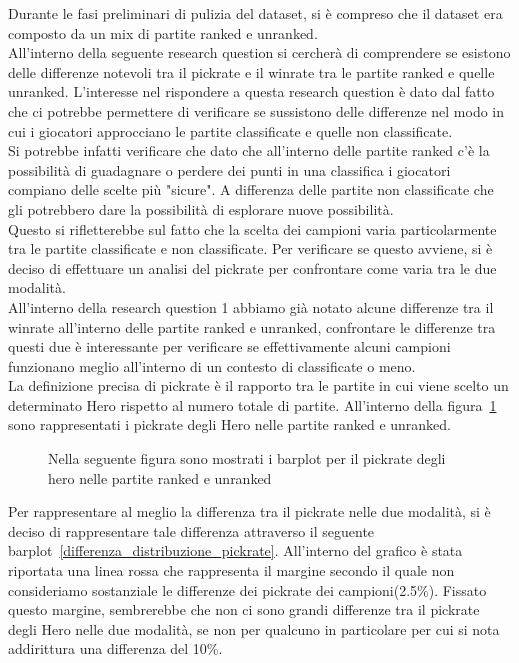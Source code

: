 Durante le fasi preliminari di pulizia del dataset, si è compreso che il dataset era composto da un mix di partite ranked e unranked. \\
All'interno della seguente research question si cercherà di comprendere se esistono delle differenze notevoli tra il pickrate e il winrate tra le partite ranked e quelle unranked. L'interesse nel rispondere a questa research question è dato dal fatto che ci potrebbe permettere di verificare se sussistono delle differenze nel modo in cui i giocatori approcciano le partite classificate e quelle non classificate. \\
Si potrebbe infatti verificare che dato che all'interno delle partite ranked c'è la possibilità di guadagnare o perdere dei punti in una classifica i giocatori compiano delle scelte più "sicure". A differenza delle partite non classificate che gli potrebbero dare la possibilità di esplorare nuove possibilità. \\
Questo si rifletterebbe sul fatto che la scelta dei campioni varia particolarmente tra le partite classificate e non classificate. Per verificare se questo avviene, si è deciso di effettuare un analisi del pickrate per confrontare come varia tra le due modalità. \\
All'interno della research question 1 abbiamo già notato alcune differenze tra il winrate all'interno delle partite ranked e unranked, confrontare le differenze tra questi due è interessante per verificare se effettivamente alcuni campioni funzionano meglio all'interno di un contesto di classificate o meno. \\
La definizione precisa di pickrate è il rapporto tra le partite in cui viene scelto un determinato Hero rispetto al numero totale di partite. All'interno della figura~\ref{distribuzione_pick_hero_ranked_unranked} sono rappresentati i pickrate degli Hero nelle partite ranked e unranked.
\begin{figure}[htbp]
\begin{center}
\hspace*{-0.15\linewidth}

\caption{Nella seguente figura sono mostrati i barplot per il pickrate degli hero nelle partite ranked e unranked}
\label{distribuzione_pick_hero_ranked_unranked}
\end{center}
\end{figure}
Per rappresentare al meglio la differenza tra il pickrate nelle due modalità, si è deciso di rappresentare tale differenza attraverso il seguente barplot~\ref{differenza_distribuzione_pickrate}. All'interno del grafico è stata riportata una linea rossa che rappresenta il margine secondo il quale non consideriamo sostanziale le differenze dei pickrate dei campioni(2.5\%). Fissato questo margine, sembrerebbe che non ci sono grandi differenze tra il pickrate degli Hero nelle due modalità, se non per qualcuno in particolare per cui si nota addirittura una differenza del 10\%.
